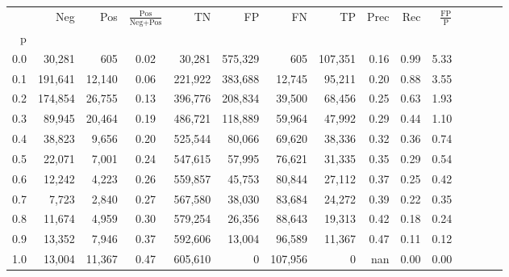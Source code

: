 \begin{tabular}{rrrcrrrrrrrrrrr}
\toprule
{} &      Neg &     Pos & $\frac{\text{Pos}}{\text{Neg}+\text{Pos}}$ &       TN &       FP &       FN &       TP &  Prec &   Rec & $\frac{\text{FP}}{\text{P}}$ \\
p   &          &         &                                            &          &          &          &          &       &       &                              \\
\midrule
0.0 &   30,281 &     605 &                                       0.02 &   30,281 &  575,329 &      605 &  107,351 &  0.16 &  0.99 &                         5.33 \\
0.1 &  191,641 &  12,140 &                                       0.06 &  221,922 &  383,688 &   12,745 &   95,211 &  0.20 &  0.88 &                         3.55 \\
0.2 &  174,854 &  26,755 &                                       0.13 &  396,776 &  208,834 &   39,500 &   68,456 &  0.25 &  0.63 &                         1.93 \\
0.3 &   89,945 &  20,464 &                                       0.19 &  486,721 &  118,889 &   59,964 &   47,992 &  0.29 &  0.44 &                         1.10 \\
0.4 &   38,823 &   9,656 &                                       0.20 &  525,544 &   80,066 &   69,620 &   38,336 &  0.32 &  0.36 &                         0.74 \\
0.5 &   22,071 &   7,001 &                                       0.24 &  547,615 &   57,995 &   76,621 &   31,335 &  0.35 &  0.29 &                         0.54 \\
0.6 &   12,242 &   4,223 &                                       0.26 &  559,857 &   45,753 &   80,844 &   27,112 &  0.37 &  0.25 &                         0.42 \\
0.7 &    7,723 &   2,840 &                                       0.27 &  567,580 &   38,030 &   83,684 &   24,272 &  0.39 &  0.22 &                         0.35 \\
0.8 &   11,674 &   4,959 &                                       0.30 &  579,254 &   26,356 &   88,643 &   19,313 &  0.42 &  0.18 &                         0.24 \\
0.9 &   13,352 &   7,946 &                                       0.37 &  592,606 &   13,004 &   96,589 &   11,367 &  0.47 &  0.11 &                         0.12 \\
1.0 &   13,004 &  11,367 &                                       0.47 &  605,610 &        0 &  107,956 &        0 &   nan &  0.00 &                         0.00 \\
\bottomrule
\end{tabular}
